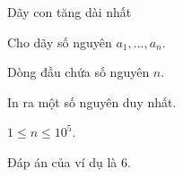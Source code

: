 \begin{problem}[
  input = stdin, output = stdout,
  time = 1, memory = 256, points = 100,
  author = Lâm, origin = {VOI 2024},
]{Dãy con tăng dài nhất}

Cho dãy số nguyên $a_1, \dots, a_n$.

\InputFile
Dòng đầu chứa số nguyên $n$.

\OutputFile
In ra một số nguyên duy nhất.

\Constraints
$1 \le n \le 10^5$.

\begin{subtasks}
\end{subtasks}

\Examples
\begin{example}
%
\end{example}

\Explanation
Đáp án của ví dụ là $6$.
\end{problem}
